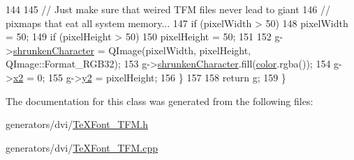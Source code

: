 \begin{DoxyCode}
144 
145     \textcolor{comment}{// Just make sure that weired TFM files never lead to giant}
146     \textcolor{comment}{// pixmaps that eat all system memory...}
147     \textcolor{keywordflow}{if} (pixelWidth > 50)
148       pixelWidth = 50;
149     \textcolor{keywordflow}{if} (pixelHeight > 50)
150       pixelHeight = 50;
151 
152     g->\hyperlink{classglyph_aeefa28a926bdd7a24595dbdc7cdf504c}{shrunkenCharacter} = QImage(pixelWidth, pixelHeight, QImage::Format\_RGB32);
153     g->\hyperlink{classglyph_aeefa28a926bdd7a24595dbdc7cdf504c}{shrunkenCharacter}.fill(\hyperlink{classglyph_ab4847af7a7b13322d5651fe47735c8dd}{color}.rgba());
154     g->\hyperlink{classglyph_a07a7aa840a9a34588a5cc02508ac5e6d}{x2} = 0;
155     g->\hyperlink{classglyph_afa1607f13eb1db99a5a3b1c92d47db7f}{y2} = pixelHeight;
156   \}
157 
158   \textcolor{keywordflow}{return} g;
159 \}
\end{DoxyCode}


The documentation for this class was generated from the following files\+:\begin{DoxyCompactItemize}
\item 
generators/dvi/\hyperlink{TeXFont__TFM_8h}{Te\+X\+Font\+\_\+\+T\+F\+M.\+h}\item 
generators/dvi/\hyperlink{TeXFont__TFM_8cpp}{Te\+X\+Font\+\_\+\+T\+F\+M.\+cpp}\end{DoxyCompactItemize}
